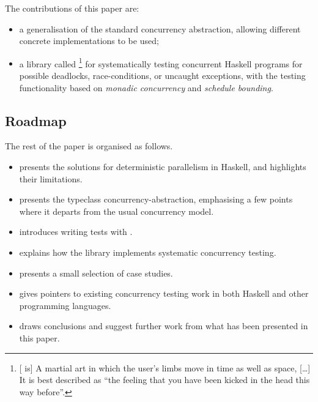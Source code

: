 The contributions of this paper are:

\begin{itemize}
  \item a generalisation of the standard concurrency abstraction,
    allowing different concrete implementations to be used;

  \item a library called \dejafu{}\footnote{[\dejafu{} is] A martial
      art in which the user's limbs move in time as well as space,
      [\ldots{}] It is best described as ``the feeling that you have
      been kicked in the head this way before''. } for systematically testing
    concurrent Haskell programs for possible deadlocks,
    race-conditions, or uncaught exceptions, with the testing
    functionality based on \textit{monadic
      concurrency}\cite{monadconc} and \textit{schedule
      bounding}\cite{pbound}.
\end{itemize}

\subsection*{Roadmap}

The rest of the paper is organised as follows.

\begin{itemize}
  \item {} presents the solutions for deterministic
    parallelism in Haskell, and highlights their limitations.

  \item {} presents the typeclass concurrency-abstraction,
    emphasising a few points where it departs from the usual
    concurrency model.

  \item {} introduces writing tests with \dejafu{}.

  \item {} explains how the library implements systematic
    concurrency testing.

  \item {} presents a small selection of case studies.

  \item {} gives pointers to existing concurrency testing
    work in both Haskell and other programming languages.

  \item {} draws conclusions and suggest further work
    from what has been presented in this paper.
\end{itemize}

